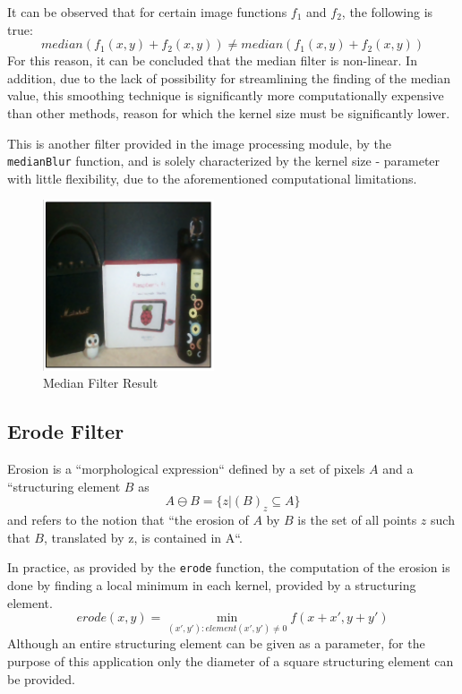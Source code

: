 It can be observed that for certain image functions \(f_1\) and \(f_2\), the following is true:
\[median(f_1(x, y) + f_2(x, y)) \neq median(f_1(x, y) + f_2(x, y))\]
For this reason, it can be concluded that the median filter is non-linear. In addition, due to the lack of
possibility for streamlining the finding of the median value, this smoothing technique is significantly more
computationally expensive than other methods, reason for which the kernel size must be significantly lower.

This is another filter provided in the image processing module, by the \verb|medianBlur| function, and is
solely characterized by the kernel size - parameter with little flexibility, due to the aforementioned
computational limitations.

\begin{figure}[H]
	\includegraphics[width=0.45\textwidth, height=0.45\textwidth]{resources/Median_2.png}
	\caption{Median Filter Result}
\end{figure}

\subsection{Erode Filter}

Erosion is a ``morphological expression`` defined by a set of pixels \(A\) and a ``structuring element \(B\) \cite{dipBook}
as \[A \ominus B = \{z | (B)_z \subseteq A\}\] and refers to the notion that
``the erosion of \(A\) by \(B\) is the set of all points \(z\) such that \(B\), translated by z, is contained
in A``. \cite{dipBook}

In practice, as provided by the \verb|erode| function, the computation of the erosion is done by finding a
local minimum in each kernel, provided by a structuring element. \cite{opencvImproc}
\[erode(x, y) = \min\limits_{(x', y'): element(x', y') \neq 0} f(x + x', y + y')\]
Although an entire structuring element can be given as a parameter, for the purpose of this application only
the diameter of a square structuring element can be provided.

